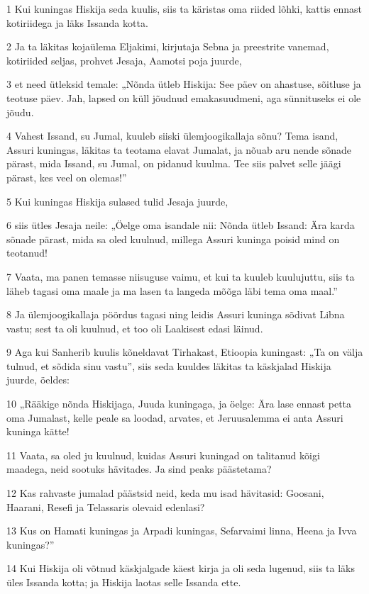 \par 1 Kui kuningas Hiskija seda kuulis, siis ta käristas oma riided lõhki, kattis ennast kotiriidega ja läks Issanda kotta.
\par 2 Ja ta läkitas kojaülema Eljakimi, kirjutaja Sebna ja preestrite vanemad, kotiriided seljas, prohvet Jesaja, Aamotsi poja juurde,
\par 3 et need ütleksid temale: „Nõnda ütleb Hiskija: See päev on ahastuse, sõitluse ja teotuse päev. Jah, lapsed on küll jõudnud emakasuudmeni, aga sünnituseks ei ole jõudu.
\par 4 Vahest Issand, su Jumal, kuuleb siiski ülemjoogikallaja sõnu? Tema isand, Assuri kuningas, läkitas ta teotama elavat Jumalat, ja nõuab aru nende sõnade pärast, mida Issand, su Jumal, on pidanud kuulma. Tee siis palvet selle jäägi pärast, kes veel on olemas!”
\par 5 Kui kuningas Hiskija sulased tulid Jesaja juurde,
\par 6 siis ütles Jesaja neile: „Öelge oma isandale nii: Nõnda ütleb Issand: Ära karda sõnade pärast, mida sa oled kuulnud, millega Assuri kuninga poisid mind on teotanud!
\par 7 Vaata, ma panen temasse niisuguse vaimu, et kui ta kuuleb kuulujuttu, siis ta läheb tagasi oma maale ja ma lasen ta langeda mõõga läbi tema oma maal.”
\par 8 Ja ülemjoogikallaja pöördus tagasi ning leidis Assuri kuninga sõdivat Libna vastu; sest ta oli kuulnud, et too oli Laakisest edasi läinud.
\par 9 Aga kui Sanherib kuulis kõneldavat Tirhakast, Etioopia kuningast: „Ta on välja tulnud, et sõdida sinu vastu”, siis seda kuuldes läkitas ta käskjalad Hiskija juurde, öeldes:
\par 10 „Rääkige nõnda Hiskijaga, Juuda kuningaga, ja öelge: Ära lase ennast petta oma Jumalast, kelle peale sa loodad, arvates, et Jeruusalemma ei anta Assuri kuninga kätte!
\par 11 Vaata, sa oled ju kuulnud, kuidas Assuri kuningad on talitanud kõigi maadega, neid sootuks hävitades. Ja sind peaks päästetama?
\par 12 Kas rahvaste jumalad päästsid neid, keda mu isad hävitasid: Goosani, Haarani, Resefi ja Telassaris olevaid edenlasi?
\par 13 Kus on Hamati kuningas ja Arpadi kuningas, Sefarvaimi linna, Heena ja Ivva kuningas?”
\par 14 Kui Hiskija oli võtnud käskjalgade käest kirja ja oli seda lugenud, siis ta läks üles Issanda kotta; ja Hiskija laotas selle Issanda ette.
